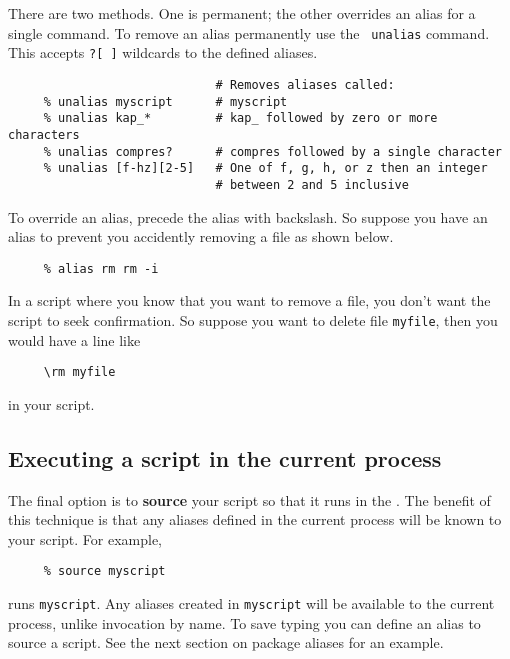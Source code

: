 There are two methods.  One is permanent; the other overrides an alias
for a single command.  To remove an alias permanently use the {\tt
unalias} command.  This accepts {\tt *?[~]} wildcards to  the defined aliases.

\small
\begin{verbatim}
                             # Removes aliases called:
     % unalias myscript      # myscript
     % unalias kap_*         # kap_ followed by zero or more characters
     % unalias compres?      # compres followed by a single character
     % unalias [f-hz][2-5]   # One of f, g, h, or z then an integer
                             # between 2 and 5 inclusive
\end{verbatim}
\normalsize

To override an alias, precede the alias with backslash.  So suppose you
have an alias to prevent you accidently removing a file as shown below.

\small
\begin{verbatim}
     % alias rm rm -i
\end{verbatim}
\normalsize
In a script where you know that you want to remove a file, you don't
want the script to seek confirmation.  So suppose you want to delete
file {\tt myfile}, then you would have a line like

\small
\begin{verbatim}
     \rm myfile
\end{verbatim}
\normalsize
in your script.


\subsection{Executing a script in the current process
\label{sc4_se_source}}

The final option is to {\bf source} your script so that it runs in the
.  The benefit of this technique is
that any aliases defined in the current process will be known to your
script.  For example,

\small
\begin{verbatim}
     % source myscript
\end{verbatim}
\normalsize
runs {\tt myscript}.  Any aliases created in {\tt myscript} will be
available to the current process, unlike invocation by name.
To save typing you can define an alias to source a script.  See the next
section on package aliases for an example.

